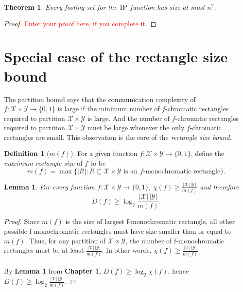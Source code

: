 \documentclass[11pt,oneside]{book}
\theoremstyle{plain}
\newtheorem{theorem}{Theorem}
\newtheorem{lemma}{Lemma}
\theoremstyle{definition}
\newtheorem{definition}{Definition}
\theoremstyle{plain}
\newcommand{\calX}{\mathcal{X}}
\newcommand{\calY}{\mathcal{Y}}
\newcommand{\IP}{\textsc{IP}}
\newcommand{\replacethistext}[1]{\textcolor{red}{#1}}
\begin{document}
\begin{theorem}
	Every fooling set for the $\IP$ function has size at most $n^2$.
\end{theorem}

\begin{proof}
	\replacethistext{Enter your proof here, if you complete it.}
\end{proof}



 \section{Special case of the rectangle size bound}

The partition bound says that the communication complexity of $f : \calX \times \calY \to \{0,1\}$ is large if the minimum number of $f$-chromatic rectangles required to partition $\calX \times \calY$ is large. And the number of $f$-chromatic rectangles required to partition $\calX \times \calY$ must be large whenever the only $f$-chromatic rectangles are small. This observation is the core of the \emph{rectangle size bound}.

\begin{definition}[$m(f)$]
	For a given function $f : \calX \times \calY \to \{0,1\}$, define the \emph{maximum rectangle size} of $f$ to be
	\[
	m(f) = \max \{ |R| : R \subseteq \calX \times \calY \mbox{ is an $f$-monochromatic rectangle} \}.
	\]
\end{definition}


\begin{lemma}
	For every function $f : \calX \times \calY \to \{0,1\}$, $\chi(f) \ge \frac{|\calX| \, |\calY|}{m(f)}$ and therefore
	\[
	D(f) \ge \log_2 \frac{|\calX| \, |\calY|}{m(f)}.
	\]
\end{lemma}

\begin{proof}
	Since $m(f)$ is the size of largest f-monochromatic rectangle, all other possible f-monochromatic rectangles must have size smaller than or equal to $m(f)$. Thus, for any partition of $\calX \times \calY$, the number of f-monochromatic rectangles must be at least $\frac{|\calX| \, |\calY|}{m(f)}$. In other words, $\chi(f) \ge \frac{|\calX| \, |\calY|}{m(f)}$.\\
	\\
	By \textbf{Lemma 1} from \textbf{Chapter 1}, $D(f) \ge \log_2 \chi(f)$, hence $D(f) \ge \log_2 \frac{|\calX| \, |\calY|}{m(f)}$.
\end{proof}
\end{document}
